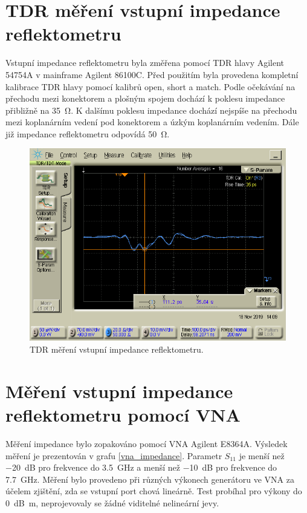 \section{TDR měření vstupní impedance reflektometru}
Vstupní impedance reflektometru byla změřena pomocí TDR hlavy Agilent 54754A v mainframe Agilent 86100C. Před použitím byla provedena kompletní kalibrace TDR hlavy pomocí kalibrů open, short a match. Podle očekávání na přechodu mezi konektorem a plošným spojem dochází k poklesu impedance přibližně na \SI{35}{\ohm}. K dalšímu poklesu impedance dochází nejspíše na přechodu mezi koplanárním vedení pod konektorem a úzkým koplanárním vedením. Dále již impedance reflektometru odpovídá \SI{50}{\ohm}.
\begin{figure}[htbp]
\includegraphics[width=\textwidth,keepaspectratio]{images/measurements/tdr_profile.png}\caption{TDR měření vstupní impedance reflektometru.}\label{tdr_profile}
\end{figure}

\section{Měření vstupní impedance reflektometru pomocí VNA}
Měření impedance bylo zopakováno pomocí \acrshort{VNA} Agilent E8364A. Výsledek měření je prezentován v grafu \ref{vna_impedance}. Parametr $S_{11}$ je menší než \SI{-20}{\deci\bel} pro frekvence do \SI{3.5}{\giga\hertz} a menší než \SI{-10}{\deci\bel} pro frekvence do \SI{7.7}{\giga\hertz}. Měření bylo provedeno při různých výkonech generátoru ve VNA za účelem zjištění, zda se vstupní port chová lineárně. Test probíhal pro výkony do \SI{0}{\deci\bel m}, neprojevovaly se žádné viditelné nelineární jevy.


